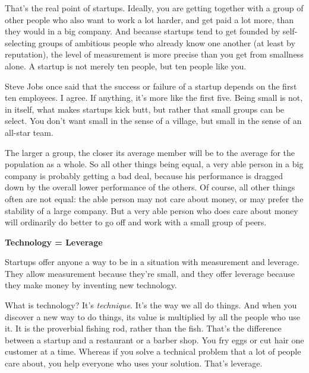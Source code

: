That's the real point
                    of startups. Ideally, you are getting together with a group
                    of other people who also want to work a lot harder, and get
                    paid a lot more, than they would in a big company. And
                    because startups tend to get founded by self-selecting
                    groups of ambitious people who already know one another (at
                    least by reputation), the level of measurement is more
                    precise than you get from smallness alone. A startup is not
                    merely ten people, but ten people like you.

Steve
                    Jobs once said that the success or failure of a startup
                    depends on the first ten employees. I agree. If anything,
                    it's more like the first five. Being small is not, in
                    itself, what makes startups kick butt, but rather that small
                    groups can be select. You don't want small in the sense of a
                    village, but small in the sense of an all-star team.

The
                    larger a group, the closer its average member will be to the
                    average for the population as a whole. So all other things
                    being equal, a very able person in a big company is probably
                    getting a bad deal, because his performance is dragged down
                    by the overall lower performance of the others. Of course,
                    all other things often are not equal: the able person may
                    not care about money, or may prefer the stability of a large
                    company. But a very able person who does care about money
                    will ordinarily do better to go off and work with a small
                    group of peers.

\textbf{Technology = Leverage}

Startups offer anyone a way to be in a
                    situation with measurement and leverage. They allow
                    measurement because they're small, and they offer leverage
                    because they make money by inventing new technology.

What
                    is technology? It's \emph{technique}. It's the way we all do
                    things. And when you discover a new way to do things, its
                    value is multiplied by all the people who use it. It is the
                    proverbial fishing rod, rather than the fish. That's the
                    difference between a startup and a restaurant or a barber
                    shop. You fry eggs or cut hair one customer at a time.
                    Whereas if you solve a technical problem that a lot of
                    people care about, you help everyone who uses your solution.
                    That's leverage.

